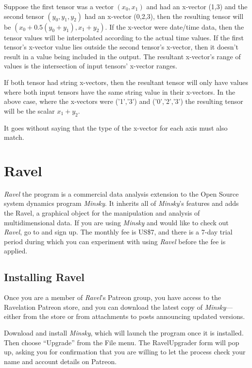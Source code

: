Suppose the first tensor was a vector $(x_0,x_1)$ and had an x-vector
(1,3) and the second tensor $(y_0,y_1,y_2)$ had an x-vector (0,2,3),
then the resulting tensor will be $(x_0+0.5(y_0+y_1), x_1+y_2)$. If
the x-vector were date/time data, then the tensor values will be
interpolated according to the actual time values. If the first
tensor's x-vector value lies outside the second tensor's x-vector,
then it doesn't result in a value being included in the output. The
resultant x-vector's range of values is the intersection of input
tensors' x-vector ranges.

If both tensor had string x-vectors, then the resultant tensor will
only have values where both input tensors have the same string value
in their x-vectors. In the above case, where the x-vectors were
('1','3') and ('0','2','3') the resulting tensor will be the scalar
$x_1+y_2$.

It goes without saying that the type of the x-vector for each axis
must also match.



\section{Ravel}

\label{Ravel}\emph{Ravel} the program is a commercial data analysis
extension to the Open Source system dynamics program \emph{Minsky}.
It inherits all of \emph{Minsky}'s features and adds the
Ravel\texttrademark,
a graphical object for the manipulation and analysis of multidimensional
data. If you are using \emph{Minsky} and would like to check out \emph{Ravel},
go to  and
sign up. The monthly fee is US\$7, and there is a
7-day trial period during which you can experiment with using \emph{Ravel}
before the fee is applied.

\subsection{Installing Ravel}

Once you are a member of \emph{Ravel}'s Patreon group, you have access
to the Ravelation Patreon store, and you can download the latest copy
of \emph{Minsky}---either from the store or from attachments to posts
announcing updated versions.

Download and install \emph{Minsky}, which will launch the program
once it is installed. Then choose ``Upgrade'' from the File menu.
The RavelUpgrader form will pop up, asking you for confirmation that
you are willing to let the process check your name and account details
on Patreon.

